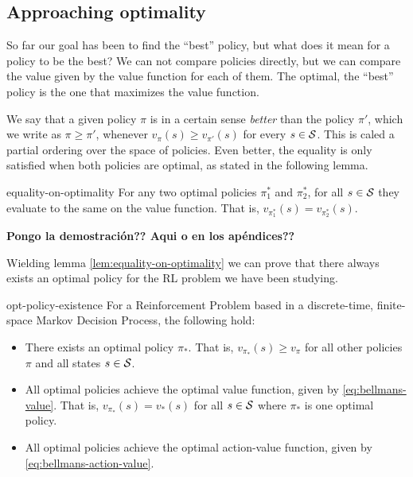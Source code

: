 \subsection{Approaching optimality}
So far our goal has been to find the ``best'' policy, but what does it mean for
a policy to be the best? We can not compare policies directly, but we can
compare the value given by the value function for each of them. The optimal, the
``best'' policy is the one that maximizes the value function.

We say that a given policy $\pi$ is in a certain sense \textit{better} than the
policy $\pi'$, which we write as $\pi \geq \pi'$, whenever $v_\pi(s) \geq
v_{\pi'} (s)$ for every $s \in \mathcal{S}$. This is caled a partial ordering over
the space of policies. Even better, the equality is only satisfied when both
policies are optimal, as stated in the following lemma.

\begin{lemma}{}{equality-on-optimality}
    For any two optimal policies $\pi^{*}_{1}$ and $\pi^{*}_{2}$, for all $s \in
    \mathcal{S}$ they evaluate to the same on the value function. That is,
    $v_{\pi^{*}_{1}} (s) = v_{\pi^{*}_{2}} (s)$.
\end{lemma}

{
    \bfseries
    \centering
    Pongo la demostración?? Aqui o en los apéndices??
}

Wielding lemma \ref{lem:equality-on-optimality} we can prove that there always
exists an optimal policy for the RL problem we have been studying.

\begin{thrm}{}{opt-policy-existence}
    For a Reinforcement Problem based in a discrete-time, finite-space Markov Decision Process, the following hold:
    \begin{itemize}
        \item There exists an optimal policy $\pi_*$. That is, $v_{\pi_*} (s)
            \geq v_{\pi}$ for all other policies $\pi$ and all states $s \in
            \mathcal{S}$.
        \item All optimal policies achieve the optimal value function, given by
            \eqref{eq:bellmans-value}. That is, $v_{\pi_*}(s) = v_* (s)$ for all
            $s \in \mathcal{S}$ where $\pi_*$ is one optimal policy.
        \item All optimal policies achieve the optimal action-value function,
            given by \eqref{eq:bellmans-action-value}.
    \end{itemize}
\end{thrm}


